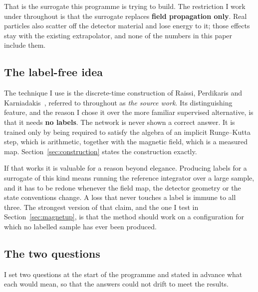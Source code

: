 \documentclass[11pt,a4paper]{article}
\begin{document}
That is the surrogate this programme is trying to build. The restriction I work
under throughout is that the surrogate replaces \textbf{field propagation only}.
Real particles also scatter off the detector material and lose energy to it;
those effects stay with the existing extrapolator, and none of the numbers in
this paper include them.

\subsection{The label-free idea}

The technique I use is the discrete-time construction of Raissi, Perdikaris and
Karniadakis~\cite{raissi2019}, referred to throughout as \emph{the source work}.
Its distinguishing feature, and the reason I chose it over the more familiar
supervised alternative, is that it needs \textbf{no labels}. The network is
never shown a correct answer. It is trained only by being required to satisfy
the algebra of an implicit Runge--Kutta step, which is arithmetic, together with
the magnetic field, which is a measured map. Section~\ref{sec:construction}
states the construction exactly.

If that works it is valuable for a reason beyond elegance. Producing labels for
a surrogate of this kind means running the reference integrator over a large
sample, and it has to be redone whenever the field map, the detector geometry or
the state conventions change. A loss that never touches a label is immune to all
three. The strongest version of that claim, and the one I test in
Section~\ref{sec:magnetup}, is that the method should work on a configuration
for which no labelled sample has ever been produced.

\subsection{The two questions}

I set two questions at the start of the programme and stated in advance what
each would mean, so that the answers could not drift to meet the results.
\end{document}
